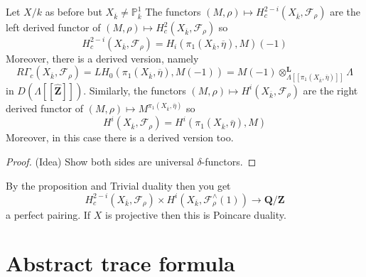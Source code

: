 \begin{proposition}
\label{proposition-curve-kpi1}
Let $X/k$ as before but $X_{\overline k}\neq \mathbb P^1_{\overline k}$
The functors
$
(M, \rho)\mapsto H_c^{2-i}(X_{\overline k}, \mathcal{F}_\rho)
$
are the left derived functor of
$(M, \rho)\mapsto H_c^2(X_{\overline k}, \mathcal{F}_\rho)$
so
$$
H_c^{2-i}(X_{\overline k},\mathcal{F}_\rho) =
H_i(\pi_1(X_{\overline k}, \overline \eta), M)(-1)
$$
Moreover, there is a derived version, namely
$$
R\Gamma_c(X_{\overline k}, \mathcal{F}_\rho)
=
LH_0(\pi_1(X_{\overline k}, \overline \eta), M(-1))
=
M(-1)
\otimes_{\Lambda[[\pi_1(X_{\overline k}, \overline \eta)]]}^\mathbf{L}
\Lambda
$$
in $D(\Lambda[[\widehat{\mathbf{Z}}]])$.
Similarly, the functors
$(M, \rho)\mapsto H^i(X_{\overline k}, \mathcal{F}_\rho)$
are the right derived functor of
$(M, \rho)\mapsto M^{\pi_1(X_{\overline k}, \overline \eta)}$
so
$$
H^i(X_{\overline k}, \mathcal{F}_\rho) =
H^i(\pi_1(X_{\overline k}, \overline \eta), M)
$$
Moreover, in this case there is a derived version too.
\end{proposition}

\begin{proof}
(Idea) Show both sides are universal $\delta$-functors.
\end{proof}

\begin{remark}
\label{remark-poincare-groups}
By the proposition and Trivial duality then you get
$$
H^{2-i}_c(X_{\overline k}, \mathcal{F}_\rho)
\times
H^i(X_{\overline k}, \mathcal{F}_\rho^\wedge(1))
\to
\mathbf{Q}/\mathbf{Z}
$$
a perfect pairing. If $X$ is projective then this is Poincare duality.
\end{remark}





\section{Abstract trace formula}
\label{section-abstract-trace-formula}

